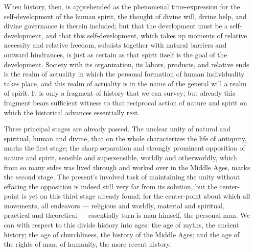 \documentclass[12pt]{book}
\begin{document}
When history, then, is apprehended as the phenomenal time-expression for the self-development of the
human spirit, the thought of divine will, divine help, and divine governance is therein included;
but that the development must be a self-development, and that this self-development, which takes up
moments of relative necessity and relative freedom, subsists together with natural barriers and
outward hindrances, is just as certain as that spirit itself is the goal of the development. Society
with its organization, its labors, products, and relative ends is the realm of actuality in which
the personal formation of human individuality takes place, and this realm of actuality is in the
name of the general will a realm of spirit. It is only a fragment of history that we can survey; but
already this fragment bears sufficient witness to that reciprocal action of nature and spirit on
which the historical advances essentially rest.

Three principal stages are already passed. The unclear unity of natural and spiritual, human and
divine, that on the whole characterizes the life of antiquity, marks the first stage; the sharp
separation and strongly prominent opposition of nature and spirit, sensible and supersensible,
worldly and otherworldly, which from so many sides was lived through and worked over in the Middle
Ages, marks the second stage. The present's involved task of maintaining the unity without effacing
the opposition is indeed still very far from its solution, but the center-point is yet on this third
stage already found; for the center-point about which all movements, all endeavors --- religious and
worldly, material and spiritual, practical and theoretical --- essentially turn is man himself,
the personal man. We can with respect to this divide history into ages: the age of myths, the ancient
history; the age of churchliness, the history of the Middle Ages; and the age of the rights of man,
of humanity, the more recent history.
\end{document}
